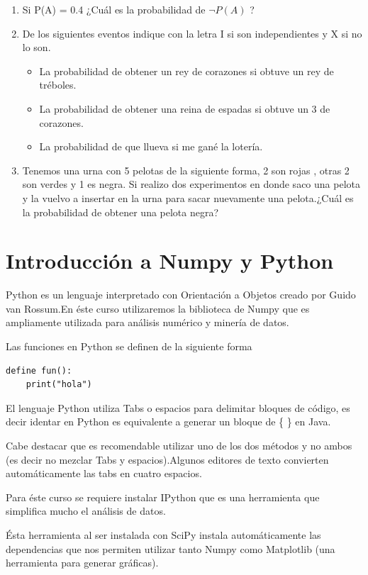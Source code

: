 \documentclass{article}
\begin{document}
\begin{enumerate}
\item Si P(A) = 0.4 ¿Cuál es la probabilidad de $ \neg P(A) $ ?
\item De los siguientes eventos indique con la letra I si son independientes y X si no lo son.
\begin{itemize}
\item La probabilidad de obtener un rey de corazones si obtuve un rey de tréboles.
\item  La probabilidad de obtener una reina de espadas si obtuve un 3 de corazones.
\item La probabilidad de que llueva si me gané la lotería.
\end{itemize}

\item Tenemos una urna con 5 pelotas de la siguiente forma, 2 son rojas , otras 2 son verdes y 1 es negra. Si realizo dos experimentos en donde saco una pelota y la vuelvo a insertar en la urna para sacar nuevamente una pelota.¿Cuál es la probabilidad de obtener una pelota negra?


\end{enumerate}


\section{Introducción a Numpy y Python}
Python es un lenguaje interpretado con Orientación a Objetos creado por Guido van Rossum.En éste curso utilizaremos la biblioteca de Numpy que es ampliamente utilizada para análisis numérico y minería de datos.

Las funciones en Python se definen de la siguiente forma


\begin{verbatim}
define fun():
    print("hola")
\end{verbatim}

El lenguaje Python utiliza Tabs o espacios para delimitar bloques de código, es decir identar en Python es equivalente a generar un bloque de \{ \} en Java.

Cabe destacar que es recomendable utilizar uno de los dos métodos y no ambos (es decir no mezclar Tabs y espacios).Algunos editores de texto convierten automáticamente las tabs en cuatro espacios.

Para éste curso se requiere instalar IPython que es una herramienta que simplifica mucho el análisis de datos.

Ésta herramienta al ser instalada con SciPy instala automáticamente las dependencias que nos permiten utilizar tanto Numpy como Matplotlib (una herramienta para generar gráficas).
\end{document}
